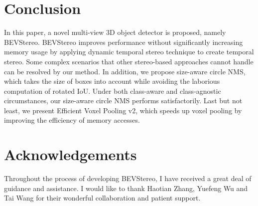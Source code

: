 \documentclass[letterpaper]{article} \usepackage[]{aaai23}  \usepackage{times}  \usepackage{helvet}  \usepackage{courier}  \usepackage[hyphens]{url}  \usepackage{graphicx} \urlstyle{rm} \def\UrlFont{\rm}  \usepackage{natbib}  \usepackage{caption} \frenchspacing  \setlength{\pdfpagewidth}{8.5in} \setlength{\pdfpageheight}{11in} \usepackage{algorithm}
\begin{document}
\section{Conclusion}
In this paper, a novel multi-view 3D object detector is proposed, namely BEVStereo. BEVStereo improves performance without significantly increasing memory usage by applying dynamic temporal stereo technique to create temporal stereo. Some complex scenarios that other stereo-based approaches cannot handle can be resolved by our method. In addition, we propose size-aware circle NMS, which takes the size of boxes into account while avoiding the laborious computation of rotated IoU. Under both class-aware and class-agnostic circumstances, our size-aware circle NMS performs satisfactorily. Last but not least, we present Efficient Voxel Pooling v2, which speeds up voxel pooling by improving the efficiency of memory accesses.


\section{Acknowledgements}

Throughout the process of developing BEVStereo, I have received a great deal of guidance and assistance. I would like to thank Haotian Zhang, Yuefeng Wu and Tai Wang for their wonderful collaboration and patient support.

\end{document}
